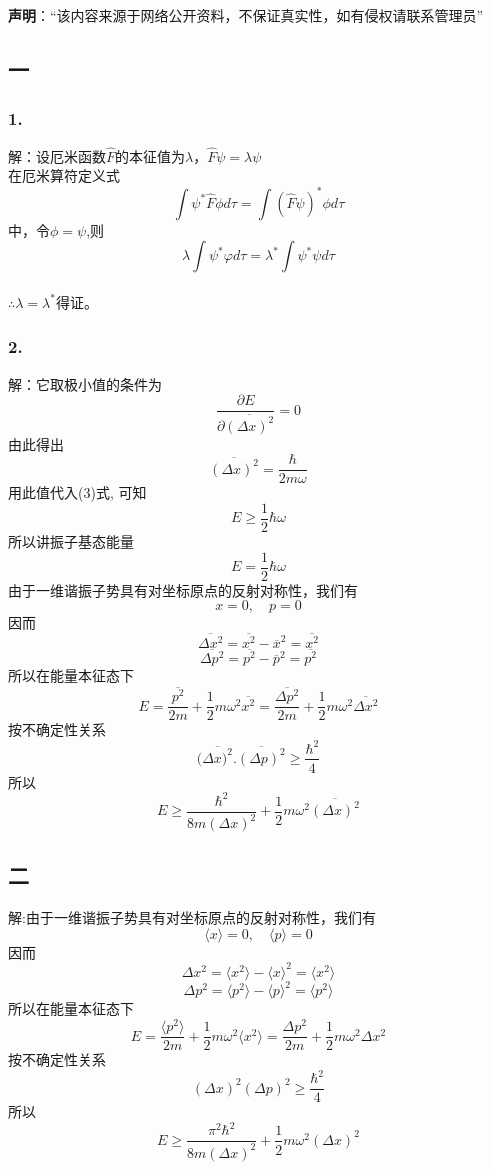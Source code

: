 
\textbf{声明}：“该内容来源于网络公开资料，不保证真实性，如有侵权请联系管理员”

\subsection{一}
\subsubsection{1.}
解：设厄米函数$\hat{F}$的本征值为$\lambda$，$\hat{F}\psi = \lambda \psi$\\
在厄米算符定义式$$\int \psi^* \hat{F} \phi d\tau = \int (\hat{F} \psi)^* \phi d\tau~$$中，令$\phi=\psi$,则$$\lambda \int \psi^* \varphi d\tau = \lambda^* \int \psi^* \psi d\tau~$$\\
$\therefore \lambda=\lambda^*$得证。
\subsubsection{2.}
解：它取极小值的条件为
$$\frac{\partial E}{\partial \overline{(\Delta x)^2}} = 0~$$
由此得出
$$\overline{(\Delta x)^2} = \frac{\hbar}{2 m \omega}~$$
用此值代入(3)式, 可知
$$E \geq \frac{1}{2} \hbar \omega~$$
所以讲振子基态能量
$$E = \frac{1}{2} \hbar \omega~$$
由于一维谐振子势具有对坐标原点的反射对称性，我们有
$$ x = 0, \quad  p = 0~$$
因而
$$ \overline{\Delta x^2} =\overline{x^2} -\overline{x}^2 =\overline{x^2}~ $$
$$ \overline{\Delta p^2} =\overline{p^2} - \overline{p}^2 =\overline{p^2}~ $$
所以在能量本征态下
$$ E = \frac{\overline{p^2}}{2m} + \frac{1}{2} m \omega^2\overline{x^2}= \frac{\overline{\Delta p^2}}{2m} + \frac{1}{2} m \omega^2 \overline{\Delta x^2}~$$
按不确定性关系
$$ (\overline{\Delta x)^2}.\overline{(\Delta p)^2}\geq \frac{\hbar^2}{4}~$$
所以
$$ E \geq \frac{\hbar^2}{8m (\Delta x)^2} + \frac{1}{2} m \omega^2 \overline{(\Delta x)^2}~$$
\subsection{二}
解:由于一维谐振子势具有对坐标原点的反射对称性，我们有
$$ \langle x \rangle = 0, \quad \langle p \rangle = 0~ $$
因而
$$ \Delta x^2 = \langle x^2 \rangle - \langle x \rangle^2 = \langle x^2 \rangle~ $$
$$ \Delta p^2 = \langle p^2 \rangle - \langle p \rangle^2 = \langle p^2 \rangle~ $$
所以在能量本征态下
$$ E = \frac{\langle p^2 \rangle}{2m} + \frac{1}{2} m \omega^2 \langle x^2 \rangle = \frac{\Delta p^2}{2m} + \frac{1}{2} m \omega^2 \Delta x^2~ $$
按不确定性关系
$$ (\Delta x)^2 (\Delta p)^2 \geq \frac{\hbar^2}{4}~$$
所以
$$ E \geq \frac{\pi^2 \hbar^2}{8m (\Delta x)^2} + \frac{1}{2} m \omega^2 (\Delta x)^2~$$
